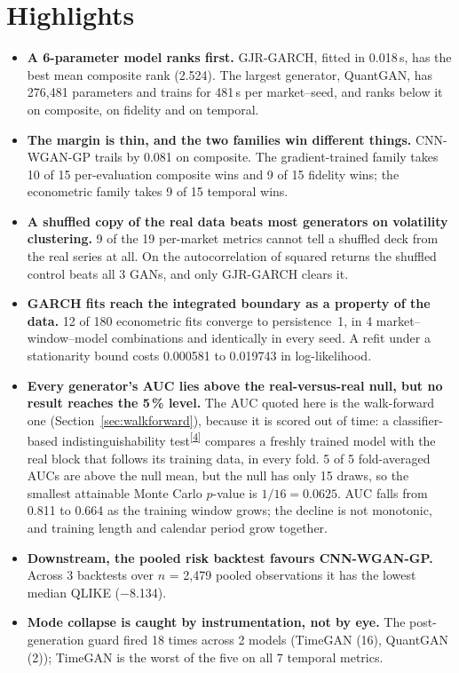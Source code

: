 \documentclass[11pt,a4paper]{article}
\makeatletter
\newcommand{\tcite}[1]{\textsuperscript{[\hyperlink{R:#1}{#1}]}}
\DeclareRobustCommand{\_}{\ifmmode\nfss@text{\textunderscore}\else\textunderscore\allowbreak\fi}
\makeatother
\begin{document}
\section{Highlights}
\label{sec:highlights}
\begin{itemize}[leftmargin=1.3em,itemsep=6pt]
\item \textbf{A 6-parameter model ranks first.} GJR-GARCH, fitted in 0.018\,s, has the best mean composite rank (2.524). The largest generator, QuantGAN, has 276,481 parameters and trains for 481\,s per market--seed, and ranks below it on composite, on fidelity and on temporal.
\item \textbf{The margin is thin, and the two families win different things.} CNN-WGAN-GP trails by 0.081 on composite. The gradient-trained family takes 10 of 15 per-evaluation composite wins and 9 of 15 fidelity wins; the econometric family takes 9 of 15 temporal wins.
\item \textbf{A shuffled copy of the real data beats most generators on volatility clustering.} 9 of the 19 per-market metrics cannot tell a shuffled deck from the real series at all. On the autocorrelation of squared returns the shuffled control beats all 3 GANs, and only GJR-GARCH clears it.
\item \textbf{GARCH fits reach the integrated boundary as a property of the data.} 12 of 180 econometric fits converge to persistence~1, in 4 market--window--model combinations and identically in every seed. A refit under a stationarity bound costs 0.000581 to 0.019743 in log-likelihood.
\item \textbf{Every generator's AUC lies above the real-versus-real null, but no result reaches the 5\,\% level.} The AUC quoted here is the walk-forward one (Section~\ref{sec:walkforward}), because it is scored out of time: a classifier-based indistinguishability test\tcite{4} compares a freshly trained model with the real block that follows its training data, in every fold. 5 of 5 fold-averaged AUCs are above the null mean, but the null has only 15 draws, so the smallest attainable Monte Carlo $p$-value is $1/16=0.0625$. AUC falls from 0.811 to 0.664 as the training window grows; the decline is not monotonic, and training length and calendar period grow together.
\item \textbf{Downstream, the pooled risk backtest favours CNN-WGAN-GP.} Across 3 backtests over $n$ = 2,479 pooled observations it has the lowest median QLIKE ($-$8.134).
\item \textbf{Mode collapse is caught by instrumentation, not by eye.} The post-generation guard fired 18 times across 2 models (TimeGAN (16), QuantGAN (2)); TimeGAN is the worst of the five on all 7 temporal metrics.
\end{itemize}
\end{document}

